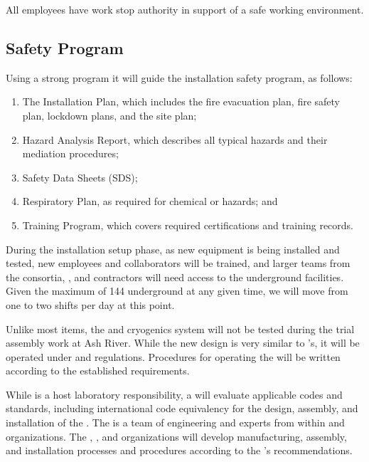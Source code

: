 All employees have work stop authority in support of  a safe working environment. 

\subsection{Safety Program}

Using a strong   program it will guide the  installation safety program, as follows:

\begin{enumerate}
\item	The  Installation  Plan, which includes the fire evacuation plan, fire safety plan, lockdown plans, and the site plan;
\item	Hazard Analysis  Report, which describes all typical hazards and their mediation procedures; 
\item	Safety Data Sheets (SDS); 
\item	Respiratory Plan, as required for chemical or  hazards; and 
\item	Training Program, which covers required certifications and  training records.
\end{enumerate}


During the installation setup phase, as new equipment is being installed and tested, new employees and collaborators will be trained, and larger teams from the consortia, ,  and contractors will need access to the underground facilities.  Given the maximum of 144  underground at any given time, we will move from one to two shifts per day at this point. 


Unlike most items, the \coldbox and cryogenics system will not be %
tested during the trial assembly work at Ash River. 
While the new \coldbox design is very similar to 's, it will be operated under  and  regulations.  Procedures for operating the \coldbox will be written according to the established requirements.



While  is  a host laboratory responsibility, a   will evaluate applicable codes and standards, including international code equivalency for the design, assembly, and installation of the  . The  is a team of engineering and  experts from within  and  organizations.  The , , and  organizations will develop manufacturing, assembly, and installation processes and procedures according to the 's recommendations. 

